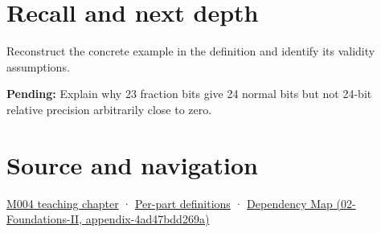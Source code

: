 \section{Recall and next depth}\label{appendix-a24fd710cf67-recall-and-next-depth}

Reconstruct the concrete example in the definition and identify its validity assumptions.

\textbf{Pending:} Explain why 23 fraction bits give 24 normal bits but not 24-bit relative precision arbitrarily close to zero.

\section{Source and navigation}\label{appendix-a24fd710cf67-source-and-navigation}

\href{Continuous\%20Notes/Computing\%20Foundations\%20-\%20From\%20Bits\%20to\%20C++\%20and\%20Systems\%20APIs\#A\%20stretching\%20ruler\%20for\%20real-valued\%20quantities}{M004 teaching chapter} · \hyperref[appendix-fd090d982a15-m004---parts-61-76]{Per-part definitions} · \href{../02-Foundations-II/main.pdf\#nameddest=appendix-4ad47bdd269a}{Dependency Map (02-Foundations-II, appendix-4ad47bdd269a)}
